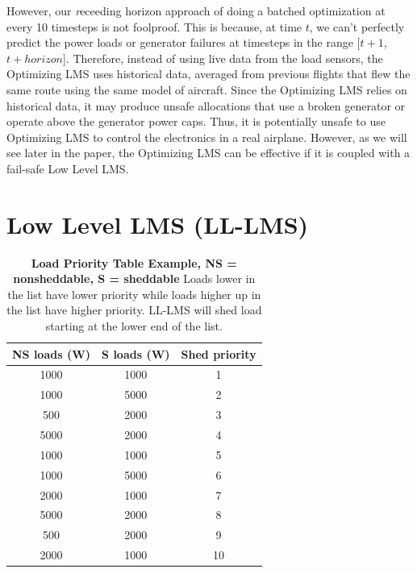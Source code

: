\documentclass{acm_proc_article-sp}
\begin{document}
However, our {\emph receeding horizon} approach of doing a batched optimization at every 10 timesteps is not foolproof.
This is because, at time $t$, we can't perfectly predict the power loads or generator failures at timesteps in the range [$t+1$, $t+horizon$]. 
Therefore, instead of using live data from the load sensors, the Optimizing LMS uses historical data, averaged from previous flights that flew the same route using the same model of aircraft.
Since the Optimizing LMS relies on historical data, it may produce unsafe allocations that use a broken generator or operate above the generator power caps.
Thus, it is potentially unsafe to use Optimizing LMS to control the electronics in a real airplane. 
However, as we will see later in the paper, the Optimizing LMS can be effective if it is coupled with a fail-safe Low Level LMS.

\section{Low Level LMS (LL-LMS)}
\label{sec:LL-LMS}
\begin{table}[t]
\caption{\textbf{Load Priority Table Example, NS = nonsheddable, S = sheddable} 
Loads lower in the list have lower priority while loads higher up in the list have
higher priority. LL-LMS will shed load starting at the lower end of the list.}
\label{T:shed}
\centering
\begin{tabular}{c|cc}
 NS loads (W) & S loads (W) & Shed priority \\ \hline
1000 & 1000 & 1 \\
1000 & 5000 & 2 \\
500 & 2000 & 3 \\
5000 & 2000 & 4 \\
1000 & 1000 & 5 \\
1000 & 5000 & 6 \\
2000 & 1000 & 7 \\
5000 & 2000 & 8 \\
500 & 2000 & 9 \\
2000 & 1000 & 10 \\ \hline
\end{tabular}
\end{table}
\end{document}
